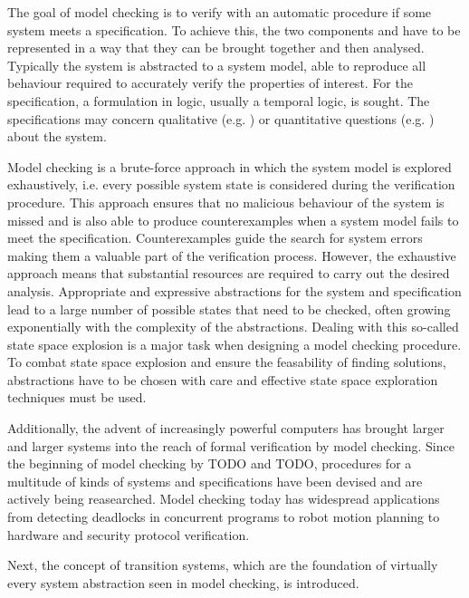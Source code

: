 The goal of model checking is to verify with an automatic procedure if some system meets a specification.
To achieve this, the two components  and  have to be represented in a way that they can be brought together and then analysed.
Typically the system is abstracted to a system model, able to reproduce all behaviour required to accurately verify the properties of interest.
For the specification, a formulation in logic, usually a temporal logic, is sought.
The specifications may concern qualitative (e.g. ) or quantitative questions (e.g. ) about the system.

Model checking is a brute-force approach in which the system model is explored exhaustively, i.e. every possible system state is considered during the verification procedure.
This approach ensures that no malicious behaviour of the system is missed and is also able to produce counterexamples when a system model fails to meet the specification.
Counterexamples guide the search for system errors making them a valuable part of the verification process.
However, the exhaustive approach means that substantial resources are required to carry out the desired analysis.
Appropriate and expressive abstractions for the system and specification lead to a large number of possible states that need to be checked, often growing exponentially with the complexity of the abstractions.
Dealing with this so-called state space explosion is a major task when designing a model checking procedure.
To combat state space explosion and ensure the feasability of finding solutions, abstractions have to be chosen with care and effective state space exploration techniques must be used.

Additionally, the advent of increasingly powerful computers has brought larger and larger systems into the reach of formal verification by model checking.
Since the beginning of model checking by TODO and TODO, procedures for a multitude of kinds of systems and specifications have been devised and are actively being reasearched. %
Model checking today has widespread applications from detecting deadlocks in concurrent programs to robot motion planning to hardware and security protocol verification. %

Next, the concept of transition systems, which are the foundation of virtually every system abstraction seen in model checking, is introduced.

